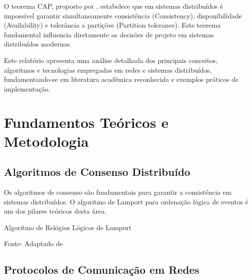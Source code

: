 O teorema CAP, proposto por , estabelece que em sistemas distribuídos é impossível garantir simultaneamente consistência (Consistency), disponibilidade (Availability) e tolerância a partições (Partition tolerance). Este teorema fundamental influencia diretamente as decisões de projeto em sistemas distribuídos modernos.

Este relatório apresenta uma análise detalhada dos principais conceitos, algoritmos e tecnologias empregadas em redes e sistemas distribuídos, fundamentando-se em literatura acadêmica reconhecida e exemplos práticos de implementação.

\section{Fundamentos Teóricos e Metodologia}

\subsection{Algoritmos de Consenso Distribuído}

Os algoritmos de consenso são fundamentais para garantir a consistência em sistemas distribuídos. O algoritmo de Lamport para ordenação lógica de eventos é um dos pilares teóricos desta área.

\begin{algorithm}[H]
  \SetAlgoLined
  
  
  \caption{Algoritmo de Relógios Lógicos de Lamport}
  {\fontsize{10pt}{\baselineskip}\selectfont
    Fonte: Adaptado de }
\end{algorithm}

\subsection{Protocolos de Comunicação em Redes}

